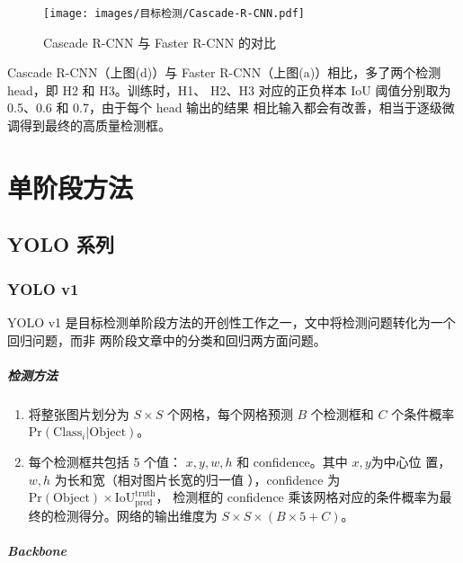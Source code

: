 \begin{figure}[ht]
  \centering
  \texttt{[image: images/目标检测/Cascade-R-CNN.pdf]}
  \caption{Cascade R-CNN 与 Faster R-CNN 的对比}
  \label{fig:Cascade-RCNN}
\end{figure}

Cascade R-CNN（上图(d)）与 Faster R-CNN（上图(a)）相比，多了两个检测 head，即 H2 和 H3。训练时，H1、
H2、H3 对应的正负样本 IoU 阈值分别取为 0.5、0.6 和 0.7，由于每个 head 输出的结果
相比输入都会有改善，相当于逐级微调得到最终的高质量检测框。

\chapter{单阶段方法}

\section{YOLO 系列}
\label{sec:YOLO}

\subsection{YOLO v1}
\label{subsec:YOLOv1}
YOLO v1 是目标检测单阶段方法的开创性工作之一，文中将检测问题转化为一个回归问题，而非
两阶段文章中的分类和回归两方面问题。

\paragraph{检测方法}

\begin{enumerate}
  \item 将整张图片划分为 $S \times S$ 个网格，每个网格预测 $ B $ 个检测框和 $ C $
    个条件概率 $ \mathrm{Pr}(\mathrm{Class}_i|\mathrm{Object}) $。
  \item 每个检测框共包括 5 个值： $x, y, w, h$ 和 confidence。其中 $x, y$为中心位
    置，$w, h$ 为长和宽（相对图片长宽的归一值
    ），confidence 为$\mathrm{Pr}(\mathrm{Object}) \times
    \mathrm{IoU}^{\mathrm{truth}}_{\mathrm{pred}}$，
    检测框的 confidence 乘该网格对应的条件概率为最终的检测得分。网络的输出维度为 $ S
    \times S \times (B \times 5 + C) $。
\end{enumerate}

\paragraph{Backbone}

